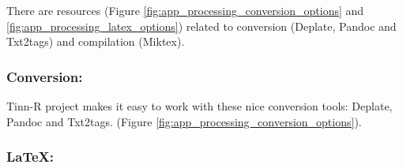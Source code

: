There are resources
(Figure \ref{fig:app_processing_conversion_options} and
\ref{fig:app_processing_latex_options})
related to conversion (Deplate, Pandoc and Txt2tags) and compilation (Miktex).


\hypertarget{working_app_processing_conversion}{}
\subsubsection{Conversion:}

Tinn-R project makes it easy to work with these nice conversion tools: Deplate, Pandoc and Txt2tags.
(Figure \ref{fig:app_processing_conversion_options}).


\hypertarget{working_app_processing_latex}{}
\subsubsection{\LaTeX:}

